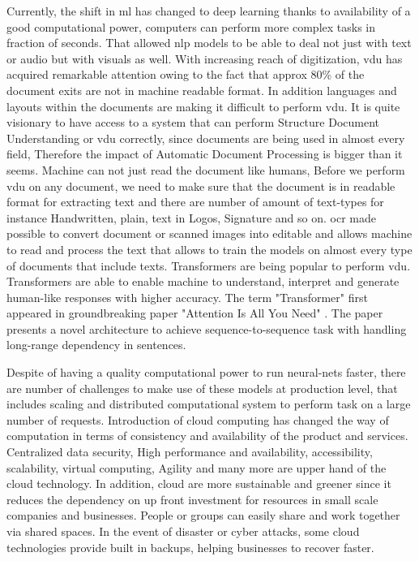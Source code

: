 Currently, the shift  in \acrshort{ml} has changed to deep learning thanks to availability of a good computational power, computers can perform more complex tasks in fraction of seconds. That allowed \acrshort{nlp} models to be able to deal not just with text or audio but with visuals as well. With increasing reach of digitization, \acrfull{vdu} has acquired remarkable attention owing to the fact that approx 80\% of the document exits are not in machine readable format. In addition languages and layouts within the documents are making it difficult to perform \acrshort{vdu}. It is quite visionary to have access to a system that can perform Structure Document Understanding or \acrshort{vdu} correctly, since documents are being used in almost every field, Therefore the impact of Automatic Document Processing is bigger than it seems. Machine can not just read the document like humans, Before we perform \acrshort{vdu} on any document, we need to make sure that the document is in readable format for extracting text and there are number of amount of text-types for instance Handwritten, plain, text in Logos, Signature and so on. \acrshort{ocr} made possible to convert document or scanned images into editable and allows machine to read and process the text that allows to train the models on almost every type of documents that include texts. Transformers are being popular to perform \acrshort{vdu}. Transformers are able to enable machine to understand, interpret and generate human-like responses with higher accuracy. The term "Transformer" first appeared in groundbreaking paper "Attention Is All You Need" \cite{vaswani2017attention}. The paper presents a novel architecture to achieve sequence-to-sequence task with handling long-range dependency in sentences. 

Despite of having a quality computational power to run neural-nets faster, there are number of challenges to make use of these models at production level, that includes scaling and distributed computational system to perform task on a large number of requests. Introduction of cloud computing has changed the way of computation in terms of consistency and availability of the product and services. Centralized data security, High performance and availability, accessibility, scalability, virtual computing, Agility and many more are upper hand of the cloud technology. In addition, cloud are more sustainable and greener since it reduces the dependency on up front investment for resources in small scale companies and businesses. People or groups can easily share and work together via shared spaces. In the event of disaster or cyber attacks, some cloud technologies provide built in backups, helping businesses to recover faster. 

